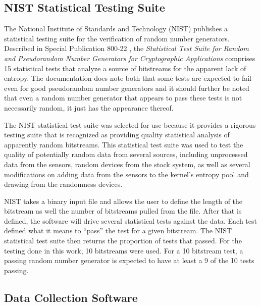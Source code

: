 \subsection{NIST Statistical Testing Suite}

The National Institute of Standards and Technology (NIST) publishes a
statistical testing suite for the verification of random number generators.
Described in Special Publication 800-22 \cite{nist}, the \textit{Statistical
Test Suite for Random and Pseudorandom Number Generators for Cryptographic
Applications} comprises 15 statistical tests that analyze a source of bitstreams
for the apparent lack of entropy. The documentation does note both that some
tests are expected to fail even for good pseudorandom number generators and it
should further be noted that even a random number generator that appears to pass
these tests is not necessarily random, it just has the appearance thereof.

The NIST statistical test suite was selected for use because it provides a
rigorous testing suite that is recognized as providing quality statistical
analysis of apparently random bitstreams. This statistical test suite was used
to test the quality of potentially random data from several sources, including
unprocessed data from the sensors, random devices from the stock system, as well
as several modifications on adding data from the sensors to the kernel's entropy
pool and drawing from the randomness devices.

NIST takes a binary input file and allows the user to define the length of the
bitstream as well the number of bitstreams pulled from the file. After that is
defined, the software will drive several statistical tests against the data.
Each test defined what it means to ``pass'' the test for a given bitstream. The
NIST statistical test suite then returns the proportion of tests that passed.
For the testing done in this work, 10 bitstreams were used. For a 10 bitstream
test, a passing random number generator is expected to have at least a 9 of the
10 tests passing.

\subsection{Data Collection Software}

